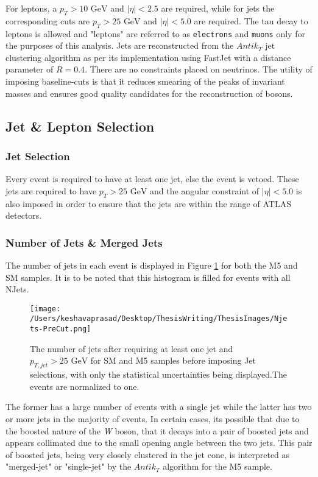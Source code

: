 For leptons, a  $p_{T}>10 \text{ GeV}$ and $|\eta|<2.5$  are required, while for jets the corresponding cuts are $p_{T}>25 \text{ GeV}$ and $|\eta|<5.0$ are required. The tau decay to leptons is allowed and "leptons" are referred to as \texttt{electrons} and \texttt{muons} only for the purposes of this analysis. Jets are reconstructed from the $Antik_{T}$ jet clustering algorithm \cite{anti-ktjet} as per its implementation using FastJet \cite{FastJet} with a distance parameter of $R =0.4$. There are no constraints placed on neutrinos. The utility of imposing baseline-cuts is that it reduces smearing of the peaks of invariant masses and ensures good quality candidates for the reconstruction of bosons. 

\subsection{Jet \& Lepton Selection}\label{EventSelection}
\subsubsection{Jet Selection}
Every event is required to have at least one jet, else the event is vetoed. These jets are required to have $p_{T}>25 \text{ GeV}$ and the angular constraint of $|\eta|<5.0$ is also imposed in order to ensure that the jets are within the range of ATLAS detectors.

\subsubsection{Number of Jets \& Merged Jets}
The number of jets in each event is displayed in Figure \ref{NJets-PreCut} for both the M5 and SM samples. It is to be noted that this histogram is filled for events with all NJets.
\begin{figure}[!h]%
	\centering
	\texttt{[image: /Users/keshavaprasad/Desktop/ThesisWriting/ThesisImages/Njets-PreCut.png]}
	\caption{The number of jets after requiring at least one jet and $p_{T,jet}>25 \text{ GeV}$ for SM and M5 samples before imposing Jet selections, with only the statistical uncertainties being displayed.The events are normalized to one.}
	\label{NJets-PreCut}
\end{figure}
The former has a large number of events with a single jet while the latter has two or more jets in the majority of events. In certain cases, its possible that due to the boosted nature of the \textit{W} boson, that it decays into a pair of boosted jets and appears collimated due to the small opening angle between the two jets. This pair of boosted jets, being very closely clustered in the jet cone, is interpreted as "merged-jet" or "single-jet" by the $Antik_{T}$ algorithm for the M5 sample.


